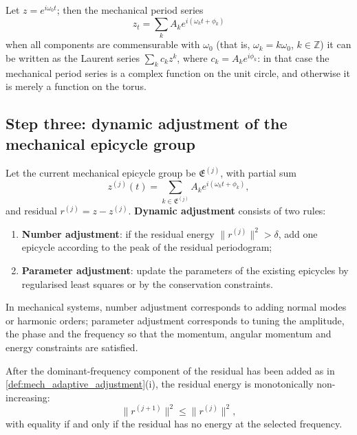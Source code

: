 \begin{remark}\label{rem:mech_series_complex}
Let $z=e^{i\omega_0t}$; then the mechanical period series
\[
z_t=\sum_k A_k e^{i(\omega_k t+\phi_k)}
\]
when all components are commensurable with $\omega_0$ (that is, $\omega_k=k\omega_0$, $k\in\mathbb Z$) it can be written as the Laurent series $\sum_k c_k z^k$, where $c_k=A_k e^{i\phi_k}$: in that case the mechanical period series is a complex function on the unit circle, and otherwise it is merely a function on the torus.
\end{remark}

\subsection{Step three: dynamic adjustment of the mechanical epicycle group}

\begin{definition}\label{def:mech_adaptive_adjustment}
Let the current mechanical epicycle group be $\mathfrak E^{(j)}$, with partial sum
\[
z^{(j)}(t)=\sum_{k\in\mathfrak E^{(j)}}A_k e^{i(\omega_k t+\phi_k)},
\]
and residual $r^{(j)}=z-z^{(j)}$. \textbf{Dynamic adjustment} consists of two rules:
\begin{enumerate}[label=(\roman*)]
    \item \textbf{Number adjustment}: if the residual energy $\|r^{(j)}\|^2>\delta$, add one epicycle according to the peak of the residual periodogram;
    \item \textbf{Parameter adjustment}: update the parameters of the existing epicycles by regularised least squares or by the conservation constraints.
\end{enumerate}
In mechanical systems, number adjustment corresponds to adding normal modes or harmonic orders; parameter adjustment corresponds to tuning the amplitude, the phase and the frequency so that the momentum, angular momentum and energy constraints are satisfied.
\end{definition}

\begin{proposition}\label{prop:mech_adaptive_growth}
After the dominant-frequency component of the residual has been added as in \cref{def:mech_adaptive_adjustment}(i), the residual energy is monotonically non-increasing:
\[
\|r^{(j+1)}\|^2\le\|r^{(j)}\|^2,
\]
with equality if and only if the residual has no energy at the selected frequency.
\end{proposition}

